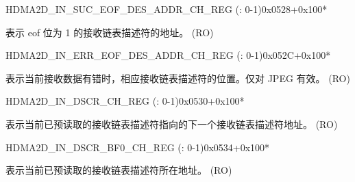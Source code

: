 \begin{register}{H}{DMA2D\_IN\_SUC\_EOF\_DES\_ADDR\_CH\_REG (: 0-1)}{0x0528+0x100*}\label{regdesc:DMA2DINSUCEOFDESADDRCHNREG}
%
\regnewline%
\begin{regdesc}\begin{reglist}
\label{fielddesc:DMA2DINSUCEOFDESADDRCHN}\item [DMA2D\_IN\_SUC\_EOF\_DES\_ADDR\_CH\regindex{n}] 表示 eof 位为 1 的接收链表描述符的地址。 (RO)
\end{reglist}\end{regdesc}
\end{register}


\begin{register}{H}{DMA2D\_IN\_ERR\_EOF\_DES\_ADDR\_CH\_REG (: 0-1)}{0x052C+0x100*}\label{regdesc:DMA2DINERREOFDESADDRCHNREG}
%
\regnewline%
\begin{regdesc}\begin{reglist}
\label{fielddesc:DMA2DINERREOFDESADDRCHN}\item [DMA2D\_IN\_ERR\_EOF\_DES\_ADDR\_CH\regindex{n}] 表示当前接收数据有错时，相应接收链表描述符的位置。仅对 JPEG 有效。 (RO)
\end{reglist}\end{regdesc}
\end{register}


\begin{register}{H}{DMA2D\_IN\_DSCR\_CH\_REG (: 0-1)}{0x0530+0x100*}\label{regdesc:DMA2DINDSCRCHNREG}
%
\regnewline%
\begin{regdesc}\begin{reglist}
\label{fielddesc:DMA2DINLINKDSCRCHN}\item [DMA2D\_INLINK\_DSCR\_CH\regindex{n}] 表示当前已预读取的接收链表描述符指向的下一个接收链表描述符地址。 (RO)
\end{reglist}\end{regdesc}
\end{register}


\begin{register}{H}{DMA2D\_IN\_DSCR\_BF0\_CH\_REG (: 0-1)}{0x0534+0x100*}\label{regdesc:DMA2DINDSCRBF0CHNREG}
%
\regnewline%
\begin{regdesc}\begin{reglist}
\label{fielddesc:DMA2DINLINKDSCRBF0CHN}\item [DMA2D\_INLINK\_DSCR\_BF0\_CH\regindex{n}] 表示当前已预读取的接收链表描述符所在地址。 (RO)
\end{reglist}\end{regdesc}
\end{register}


